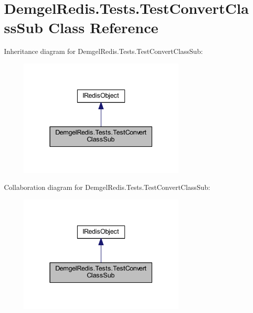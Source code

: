 \hypertarget{class_demgel_redis_1_1_tests_1_1_test_convert_class_sub}{}\section{Demgel\+Redis.\+Tests.\+Test\+Convert\+Class\+Sub Class Reference}
\label{class_demgel_redis_1_1_tests_1_1_test_convert_class_sub}


Inheritance diagram for Demgel\+Redis.\+Tests.\+Test\+Convert\+Class\+Sub\+:
\nopagebreak
\begin{figure}[H]
\begin{center}
\leavevmode
\includegraphics[width=235pt]{class_demgel_redis_1_1_tests_1_1_test_convert_class_sub__inherit__graph}
\end{center}
\end{figure}


Collaboration diagram for Demgel\+Redis.\+Tests.\+Test\+Convert\+Class\+Sub\+:
\nopagebreak
\begin{figure}[H]
\begin{center}
\leavevmode
\includegraphics[width=235pt]{class_demgel_redis_1_1_tests_1_1_test_convert_class_sub__coll__graph}
\end{center}
\end{figure}
